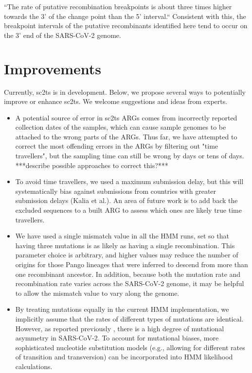 \documentclass{article}
\begin{document}
``The rate of putative recombination breakpoints is about three times higher towards the 3' of the change point than the 5' interval.`` Consistent with this, the breakpoint intervals of the putative recombinants identified here tend to occur on the 3’ end of the SARS-CoV-2 genome.

\section{Improvements}
Currently, sc2ts is in development. Below, we propose several ways to potentially improve or enhance sc2ts. We welcome suggestions and ideas from experts.

\begin{itemize}
\item A potential source of error in sc2ts ARGs comes from incorrectly reported collection dates of the samples, which can cause sample genomes to be attached to the wrong parts of the ARGs. Thus far, we have attempted to correct the most offending errors in the ARGs by filtering out "time travellers", but the sampling time can still be wrong by days or tens of days. ***describe possible approaches to correct this?***
\item To avoid time travellers, we used a maximum submission delay, but this will systematically bias against submissions from countries with greater submission delays (Kalia et al.). An area of future work is to add back the excluded sequences to a built ARG to assess which ones are likely true time travellers.
\item We have used a single mismatch value in all the HMM runs, set so that having three mutations is as likely as having a single recombination. This parameter choice is arbitrary, and higher values may reduce the number of origins for those Pango lineages that were inferred to descend from more than one recombinant ancestor. In addition, because both the mutation rate and recombination rate varies across the SARS-CoV-2 genome, it may be helpful to allow the mismatch value to vary along the genome.
\item By treating mutations equally in the current HMM implementation, we implicitly assume that the rates of different types of mutations are identical. However, as reported previously \citep{Yi2021-sc}, there is a high degree of mutational asymmetry in SARS-CoV-2. To account for mutational biases, more sophisticated nucleotide substitution models (e.g., allowing for different rates of transition and transversion) can be incorporated into HMM likelihood calculations.

\end{itemize}
\end{document}
